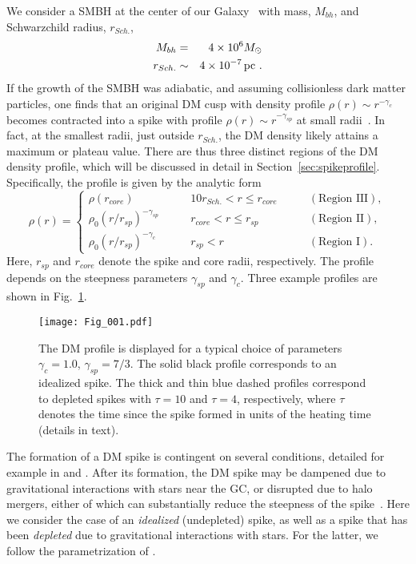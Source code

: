 \documentclass[11pt]{article}
\newcommand{\bea}{\begin{eqnarray}}
\newcommand{\eea}{\end{eqnarray}}
\begin{document}
We consider a SMBH at the center of our Galaxy~\cite{Genzel:2003cn} with mass, $M_{bh}$, and Schwarzchild radius, $r_{Sch.}$, 
%
\bea
M_{bh} &=& 4 \times 10^6 M_{\odot} \nonumber \\
r_{Sch.} &\sim & 4 \times 10^{-7} \, {\rm pc} \,\,.
\eea
%
If the growth of the SMBH was adiabatic, and assuming collisionless dark matter particles, one finds that an original DM cusp with density profile $\rho(r) \sim r^{-\gamma_c}$ becomes contracted into a spike with profile $\rho(r) \sim r^{-\gamma_{sp}}$ at small radii~\cite{Gondolo:1999ef,Ullio:2001fb}.  In fact, at the smallest radii, just outside $r_{Sch.}$, the DM density likely attains a maximum or plateau value.  There are thus three distinct regions of the DM density profile, which will be discussed in detail in Section~\ref{sec:spikeprofile}.  Specifically, the profile is given by the analytic form
%
\begin{equation}
\label{density}
\rho(r)=\left\{ \begin{array}{lll}
\rho(r_{core}) & \qquad 10r_{Sch.}<r\le r_{core} & \qquad  (\textrm{Region III}),\\
 \rho_0 \left({r/r_{sp}}\right)^{-\gamma_{sp}}  & \qquad r_{core} < r
    \le  r_{sp} & \qquad  (\textrm{Region II}),\\
 \rho_0 \left({r/r_{sp}}\right)^{-\gamma_c} & \qquad r_{sp}
    < r & \qquad  (\textrm{Region I}).
\end{array} \right. 
\end{equation}
%
Here, $r_{sp}$ and $r_{core}$ denote the spike and core radii, respectively. The profile depends on the steepness parameters $\gamma_{sp}$ and $\gamma_c$.  Three example profiles are shown in Fig.~\ref{profile}.  
%
\begin{figure}[t]
\centering
\texttt{[image: Fig\_001.pdf]}
\caption{The DM profile is displayed for a typical choice of parameters $\gamma_c = 1.0$, $\gamma_{sp} = 7/3$. The solid black profile corresponds to an idealized spike. The thick and thin blue dashed profiles correspond to depleted spikes with $\tau = 10$ and $\tau = 4$, respectively, where $\tau$ denotes the time since the spike formed in units of the heating time (details in text). }


  \label{profile}
\end{figure}
%

The formation of a DM spike is contingent on several conditions, detailed for example in \cite{Gondolo:1999ef} and \cite{Ullio:2001fb}.  After its formation, the DM spike may be dampened due to gravitational interactions with 
stars near the GC, or disrupted due to halo mergers, either of which can substantially reduce the steepness of the spike~\cite{Ullio:2001fb}. Here we consider the case of an {\it idealized} (undepleted) spike, as well as a spike that has been {\it depleted} due to gravitational interactions with stars.  For the latter, we follow the parametrization of \cite{Ahn:2007ty}.
\end{document}
